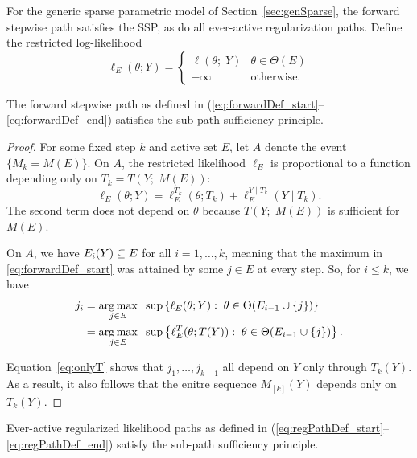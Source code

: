 \documentclass{article}
\begin{document}
For the generic sparse parametric model of Section~\ref{sec:genSparse}, the forward stepwise path satisfies the SSP, as do all ever-active regularization paths. 
Define the restricted log-likelihood
\begin{equation}
\ell_E(\theta; Y) = \left\{\begin{matrix} 
    \ell(\theta; \;Y) & \theta \in \Theta(E)\\ 
    -\infty  & \mathrm{ otherwise.}\end{matrix}\right. 
\end{equation}

\begin{proposition}\label{prop:forwardSSP}
  The forward stepwise path as defined in
  (\ref{eq:forwardDef_start}--\ref{eq:forwardDef_end}) satisfies the 
  sub-path sufficiency principle.
\end{proposition}
\begin{proof}
  For some fixed step $k$ and active set $E$, 
  let $A$ denote the event $\{M_k = M(E)\}$. 
  On $A$, the restricted likelihood $\ell_E$ is proportional to a
  function depending only on $T_k = T(Y; \;M(E))$:
  \[
  \ell_E(\theta; Y) = \ell_E^{T_k}(\theta; T_k) 
  + \ell_E^{Y \mid T_k}(Y \mid T_k).
  \]
  The second term does not depend on $\theta$ 
  because $T(Y; \;M(E))$ is sufficient for $M(E)$.

  On $A$, we have $E_i(Y) \subseteq E$ for all $i=1,\ldots, k$, meaning   that the maximum in \eqref{eq:forwardDef_start} was attained by some $j\in E$ at every step. So, for $i \leq k$, we have
\begin{align}
  j_i &= \operatorname*{arg\,max}_{j\in E} \;\;\sup \left\{\ell_E(\theta; Y):\;
    \theta\in\Theta(E_{i-1} \cup \{j\})\right\} \\
  &= \operatorname*{arg\,max}_{j\in E} \;\;\sup \left\{\ell_E^T(\theta; T(Y)):\;
    \theta\in\Theta(E_{i-1} \cup \{j\})\right\}. \label{eq:onlyT}
\end{align}

Equation~\eqref{eq:onlyT} shows that $j_1,\ldots, j_{k-1}$ all depend on $Y$ only through $T_k(Y)$. As a result, it also follows that the enitre sequence $M_{[k]}(Y)$ depends only on $T_k(Y)$.
\end{proof}

\begin{proposition}\label{prop:regPathSSP}
Ever-active regularized likelihood paths as defined in 
(\ref{eq:regPathDef_start}--\ref{eq:regPathDef_end}) satisfy the
sub-path sufficiency principle.
\end{proposition}
\end{document}
